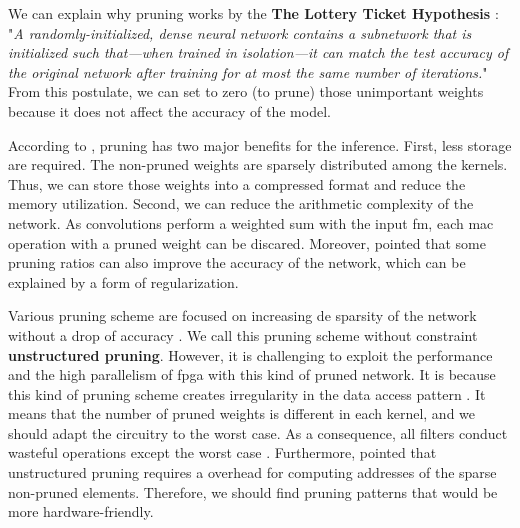 We can explain why pruning works by the \textbf{The Lottery Ticket Hypothesis} \cite{frankle_lottery_2019, frankle_early_2020}: "\textit{A randomly-initialized, dense neural network contains a subnetwork that is initialized such that—when trained in isolation—it can match the test accuracy of the original network after training for at most the same number of iterations.}" From this postulate, we can set to zero (to prune) those unimportant weights because it does not affect the accuracy of the model.

According to \textcite{cheng_recent_2018}, pruning has two major benefits for the inference. First, less storage are required. The non-pruned weights are sparsely distributed among the kernels. Thus, we can store those weights into a compressed format and reduce the memory utilization. Second, we can reduce the arithmetic complexity of the network. As convolutions perform a weighted sum with the input \acrshort{fm}, each \acrfull{mac} operation with a pruned weight can be discared. Moreover, \textcite{han_learning_2015, mao_exploring_2017, kang_accelerator-aware_2020} pointed that some pruning ratios can also improve the accuracy of the network, which can be explained by a form of regularization.

Various pruning scheme are focused on increasing de sparsity of the network without a drop of accuracy \cite{han_learning_2015, han_deep_2016}.  We call this pruning scheme without constraint \textbf{unstructured pruning}. However, it is challenging to exploit the performance and the high parallelism of \acrshort{fpga} with this kind of pruned network. It is because this kind of pruning scheme creates irregularity in the data access pattern \cite{zhu_efficient_2020}. It means that the number of pruned weights is different in each kernel, and we should adapt the circuitry to the worst case. As a consequence, all filters conduct wasteful operations except the worst case \cite{shimoda_filter-wise_2019}. Furthermore, \textcite{anwar_structured_2017} pointed that unstructured pruning requires a overhead for computing addresses of the sparse non-pruned elements. Therefore, we should find pruning patterns that would be more hardware-friendly.


